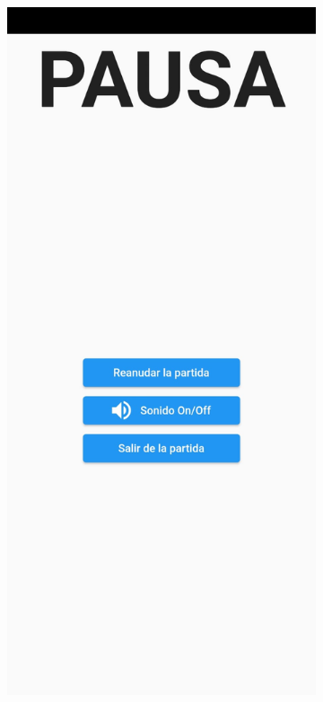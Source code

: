 \documentclass{article}
\begin{document}
\begin{figure}[H]
  \begin{subfigure}{0.5\textwidth}
          \includegraphics[width=\textwidth]{imagenes/captura6.jpeg}

\end{subfigure}
\end{figure}
\end{document}
